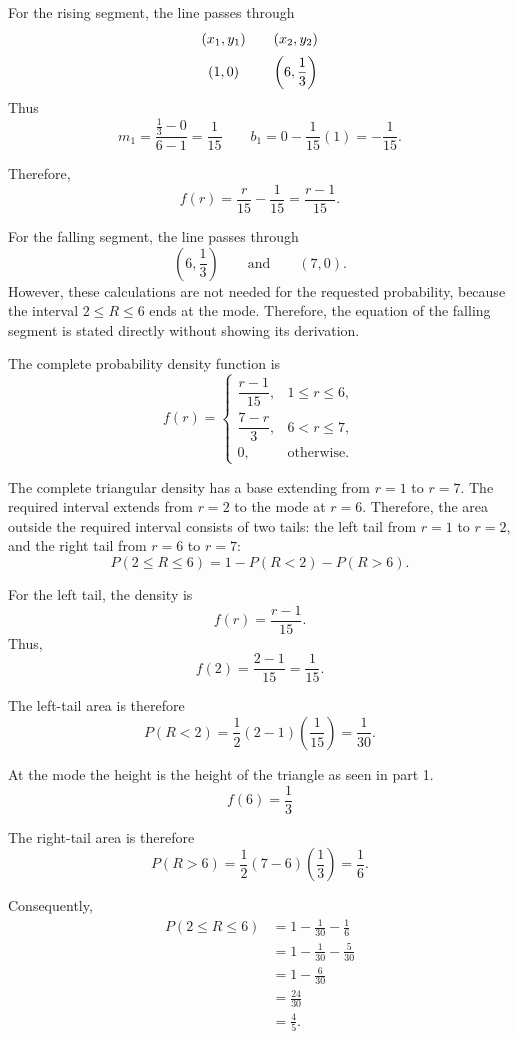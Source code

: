 {			For the rising segment, the line passes through
			\[
			\begin{array}{c@{\qquad}c}
				(x_1,y_1) & (x_2,y_2) \\[2mm]
				(1,0)
				&
				\left(6,\dfrac13\right)
			\end{array}
			\]
			Thus
			\[
			m_1
			=
			\frac{\frac13-0}{6-1}
			=
			\frac1{15}
			\qquad
			b_1
			=
			0-\frac1{15}(1)
			=
			-\frac1{15}.
			\]
			
			Therefore,
			\[
			f(r)
			=
			\frac{r}{15}-\frac1{15}
			=
			\frac{r-1}{15}.
			\]
			
			For the falling segment, the line passes through
			\[
			\left(6,\frac13\right)
			\qquad\text{and}\qquad
			(7,0).
			\]
			However, these calculations are not needed for the requested
			probability, because the interval \(2\le R\le6\) ends at the mode.
			Therefore, the equation of the falling segment is stated directly
			without showing its derivation.
			
			The complete probability density function is
			\[
			f(r)=
			\begin{cases}
				\dfrac{r-1}{15},&1\le r\le6,\\[1mm]
				\dfrac{7-r}{3},&6<r\le7,\\[1mm]
				0,&\text{otherwise.}
			\end{cases}
			\]
		
		The complete triangular density has a base extending from
		\(r=1\) to \(r=7\). The required interval extends from
		\(r=2\) to the mode at \(r=6\). Therefore, the area outside
		the required interval consists of two tails:
		the left tail from \(r=1\) to \(r=2\), and the right tail
		from \(r=6\) to \(r=7\):
		\[
		P(2\le R\le6)
		=
		1-P(R<2)-P(R>6).
		\]
		
		For the left tail, the density is
		\[
		f(r)=\frac{r-1}{15}.
		\]
		Thus,
		\[
		f(2)
		=
		\frac{2-1}{15}
		=
		\frac1{15}.
		\]
		
		The left-tail area is therefore
		\[
		P(R<2)
		=
		\frac12(2-1)\left(\frac1{15}\right)
		=
		\frac1{30}.
		\]
		
		At the mode the height is the height of the triangle as seen in part 1.
		\[
		f(6)
		=
		\frac{1}{3}		\]
		
		The right-tail area is therefore
		\[
		P(R>6)
		=
		\frac12(7-6)\left(\frac13\right)
		=
		\frac16.
		\]
		
		Consequently,
		\[
		\begin{aligned}
			P(2\le R\le6)
			&=
			1-\frac1{30}-\frac16
			\\
			&=
			1-\frac1{30}-\frac5{30}
			\\
			&=
			1-\frac6{30}
			\\
			&=
			\frac{24}{30}
			\\
			&=
			\frac45.
		\end{aligned}
		\]
		
}
